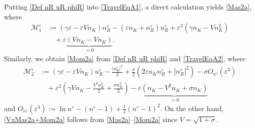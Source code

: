 \documentclass{amsart}
\newcommand{\veps}{\varepsilon}
\numberwithin{equation}{section}
\theoremstyle{plain}%
\theoremstyle{definition}
\theoremstyle{remark}
\theoremstyle{remark}
\begin{document}
Putting \eqref{Def nR uR phiR} into \eqref{TravelEqA1}, a direct calculation yields \eqref{Mas2a}, where
\begin{equation}\label{Mas1}
\begin{split}
\mathcal{M}_1^\veps
& :=  (\gamma \veps - \veps Vn_{K}) n_R^{\veps} - (\veps n_{K} + n_R^{\veps})u_R^{\veps}   + \veps^2(\gamma n_{K} - Vn_{K}^2) \\
& \quad + \veps\underbrace{ ( V n_{K} -  Vn_{K} ) }_{=0}.
\end{split}
\end{equation}
Similarly, we obtain \eqref{Mom2a} from \eqref{Def nR uR phiR} and \eqref{TravelEqA2}, where
\begin{equation}\label{Mom1} 
\begin{split}
\mathcal{M}_2^\veps
& :=  (\gamma \veps  -  \veps Vn_K)u_R^{\veps} - \frac{|u_{R}^{\veps}|^2}{2}  + \frac{\sigma}{2}\left( 2\veps n_K n_R^{\veps} + |n_R^{\veps}|^2\right) -\sigma O_{n^{\veps}}(\veps^3) \\
& \quad  + \veps^2\left(\gamma Vn_K - \frac{V^2n_K^2}{2} + \frac{\sigma n_K^2}{2}\right)  - \veps\underbrace{(n_K-V^2n_K+\sigma n_K)}_{=0}
\end{split}
\end{equation}
and $O_{n^{\veps}}(\veps^3) := \ln n^{\veps} - (n^{\veps}-1)+\frac{1}{2}(n^{\veps}-1)^2$.
On the other hand,   \eqref{VxMas2a+Mom2a} follows from \eqref{Mas2a}--\eqref{Mom2a} since $V=\sqrt{1+\sigma}$. 
\end{document}
